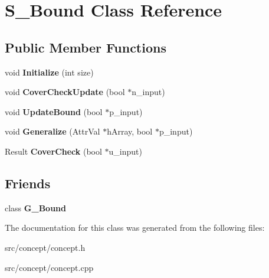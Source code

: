 \hypertarget{classS__Bound}{\section{S\-\_\-\-Bound Class Reference}
\label{classS__Bound}
}
\subsection*{Public Member Functions}
\begin{DoxyCompactItemize}
\item 
\hypertarget{classS__Bound_abeb4548d8a255438173bda64849b0a4d}{void {\bfseries Initialize} (int size)}\label{classS__Bound_abeb4548d8a255438173bda64849b0a4d}

\item 
\hypertarget{classS__Bound_aee5a88ab73dd09ac42953b6f3545dfe2}{void {\bfseries Cover\-Check\-Update} (bool $\ast$n\-\_\-input)}\label{classS__Bound_aee5a88ab73dd09ac42953b6f3545dfe2}

\item 
\hypertarget{classS__Bound_a1391ba6c3f3fab3fd5fa57ecf8e1e66a}{void {\bfseries Update\-Bound} (bool $\ast$p\-\_\-input)}\label{classS__Bound_a1391ba6c3f3fab3fd5fa57ecf8e1e66a}

\item 
\hypertarget{classS__Bound_ae266bf5fa4d70959ce3b33ebe2d13dfa}{void {\bfseries Generalize} (Attr\-Val $\ast$h\-Array, bool $\ast$p\-\_\-input)}\label{classS__Bound_ae266bf5fa4d70959ce3b33ebe2d13dfa}

\item 
\hypertarget{classS__Bound_ad42d2df371d817894fd44faff0eadd2f}{Result {\bfseries Cover\-Check} (bool $\ast$u\-\_\-input)}\label{classS__Bound_ad42d2df371d817894fd44faff0eadd2f}

\end{DoxyCompactItemize}
\subsection*{Friends}
\begin{DoxyCompactItemize}
\item 
\hypertarget{classS__Bound_ada6e422609483cdffa32ad88125d9f0d}{class {\bfseries G\-\_\-\-Bound}}\label{classS__Bound_ada6e422609483cdffa32ad88125d9f0d}

\end{DoxyCompactItemize}


The documentation for this class was generated from the following files\-:\begin{DoxyCompactItemize}
\item 
src/concept/concept.\-h\item 
src/concept/concept.\-cpp\end{DoxyCompactItemize}

